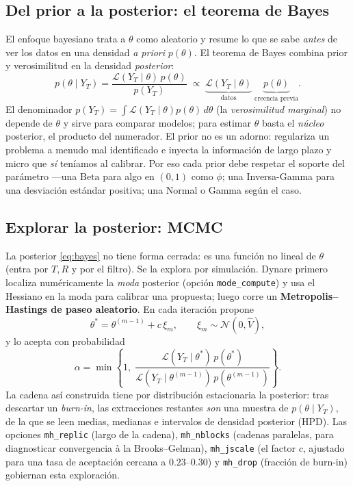 \documentclass[11pt,a4paper]{report}
\newcommand{\code}[1]{\texttt{#1}}
\begin{document}
\subsection{Del prior a la posterior: el teorema de Bayes}

El enfoque bayesiano trata a $\theta$ como aleatorio y resume lo que se sabe
\emph{antes} de ver los datos en una densidad \emph{a priori} $p(\theta)$. El
teorema de Bayes combina prior y verosimilitud en la densidad \emph{posterior}:
\begin{equation}
p(\theta\mid Y_T) = \frac{\mathcal{L}(Y_T\mid\theta)\,p(\theta)}{p(Y_T)}
\;\propto\; \underbrace{\mathcal{L}(Y_T\mid\theta)}_{\text{datos}}\;
\underbrace{p(\theta)}_{\text{creencia previa}}.
\label{eq:bayes}
\end{equation}
El denominador $p(Y_T)=\int \mathcal{L}(Y_T\mid\theta)p(\theta)\,d\theta$ (la
\emph{verosimilitud marginal}) no depende de $\theta$ y sirve para comparar modelos;
para estimar $\theta$ basta el \emph{núcleo} posterior, el producto del numerador. El
prior no es un adorno: regulariza un problema a menudo mal identificado e inyecta la
información de largo plazo y micro que \emph{sí} teníamos al calibrar. Por eso cada
prior debe respetar el soporte del parámetro ---una $\mathrm{Beta}$ para algo en
$(0,1)$ como $\phi$; una Inversa-Gamma para una desviación estándar positiva; una
Normal o Gamma según el caso.

\subsection{Explorar la posterior: MCMC}

La posterior \eqref{eq:bayes} no tiene forma cerrada: es una función no lineal de
$\theta$ (entra por $T,R$ y por el filtro). Se la explora por simulación. Dynare
primero localiza numéricamente la \emph{moda} posterior (opción \code{mode\_compute})
y usa el Hessiano en la moda para calibrar una propuesta; luego corre un
\textbf{Metropolis--Hastings de paseo aleatorio}. En cada iteración propone
\begin{equation}
\theta^{*} = \theta^{(m-1)} + c\,\xi_m, \qquad \xi_m\sim\mathcal{N}(0,\hat V),
\end{equation}
y lo acepta con probabilidad
\begin{equation}
\alpha = \min\!\left\{1,\;
\frac{\mathcal{L}(Y_T\mid\theta^{*})\,p(\theta^{*})}
     {\mathcal{L}(Y_T\mid\theta^{(m-1)})\,p(\theta^{(m-1)})}\right\}.
\label{eq:mh}
\end{equation}
La cadena así construida tiene por distribución estacionaria la posterior: tras
descartar un \emph{burn-in}, las extracciones restantes \emph{son} una muestra de
$p(\theta\mid Y_T)$, de la que se leen medias, medianas e intervalos de densidad
posterior (HPD). Las opciones \code{mh\_replic} (largo de la cadena),
\code{mh\_nblocks} (cadenas paralelas, para diagnosticar convergencia à la
Brooks--Gelman), \code{mh\_jscale} (el factor $c$, ajustado para una tasa de
aceptación cercana a $0.23$--$0.30$) y \code{mh\_drop} (fracción de burn-in)
gobiernan esta exploración.
\end{document}
